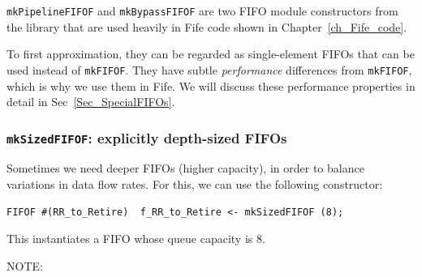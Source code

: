 \label{Sec_SpecialFIFOs_mention}



{\tt mkPipelineFIFOF} and {\tt mkBypassFIFOF} are two FIFO module
constructors from the {\BSV} library that are used heavily in Fife code
shown in Chapter~\ref{ch_Fife_code}.

To first approximation, they can be regarded as single-element FIFOs
that can be used instead of {\tt mkFIFOF}.  They have subtle
\emph{performance} differences from {\tt mkFIFOF}, which is why we use
them in Fife.  We will discuss these performance properties in detail
in Sec~\ref{Sec_SpecialFIFOs}.


\subsubsection{{\tt mkSizedFIFOF}: explicitly depth-sized FIFOs}

\label{Sec_mkSizedFIFOF}

Sometimes we need deeper FIFOs (higher capacity), in order to balance
variations in data flow rates.  For this, we can use the following
constructor:


{\footnotesize
\begin{Verbatim}[frame=single]
   FIFOF #(RR_to_Retire)  f_RR_to_Retire <- mkSizedFIFOF (8);
\end{Verbatim}
}

This instantiates a FIFO whose queue capacity is 8.

\vspace{2ex}

NOTE: \hfill {}

